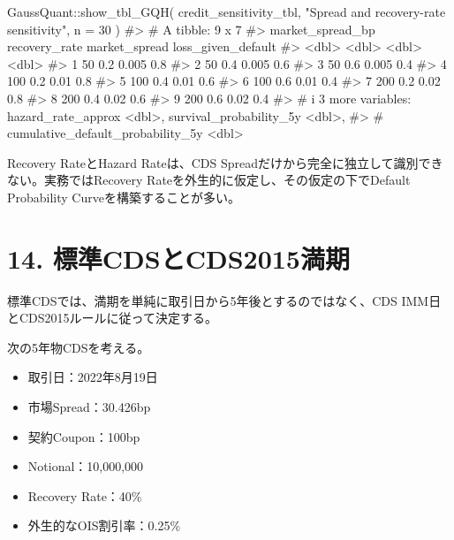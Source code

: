 \documentclass[
  letterpaper,
  DIV=11,
  numbers=noendperiod]{scrreprt}
\newenvironment{Shaded}{\begin{snugshade}}{\end{snugshade}}
\newcommand{\AttributeTok}[1]{\textcolor[rgb]{0.40,0.45,0.13}{#1}}
\newcommand{\CommentTok}[1]{\textcolor[rgb]{0.37,0.37,0.37}{#1}}
\newcommand{\DecValTok}[1]{\textcolor[rgb]{0.68,0.00,0.00}{#1}}
\newcommand{\FunctionTok}[1]{\textcolor[rgb]{0.28,0.35,0.67}{#1}}
\newcommand{\NormalTok}[1]{\textcolor[rgb]{0.00,0.23,0.31}{#1}}
\newcommand{\SpecialCharTok}[1]{\textcolor[rgb]{0.37,0.37,0.37}{#1}}
\newcommand{\StringTok}[1]{\textcolor[rgb]{0.13,0.47,0.30}{#1}}
\providecommand{\tightlist}{%
  \setlength{\itemsep}{0pt}\setlength{\parskip}{0pt}}
\begin{document}
\begin{Shaded}
\begin{Highlighting}[]
\NormalTok{GaussQuant}\SpecialCharTok{::}\FunctionTok{show\_tbl\_GQH}\NormalTok{(}
\NormalTok{  credit\_sensitivity\_tbl,}
  \StringTok{"Spread and recovery{-}rate sensitivity"}\NormalTok{,}
  \AttributeTok{n =} \DecValTok{30}
\NormalTok{)}
\CommentTok{\#\textgreater{} \# A tibble: 9 x 7}
\CommentTok{\#\textgreater{}   market\_spread\_bp recovery\_rate market\_spread loss\_given\_default}
\CommentTok{\#\textgreater{}              \textless{}dbl\textgreater{}         \textless{}dbl\textgreater{}         \textless{}dbl\textgreater{}              \textless{}dbl\textgreater{}}
\CommentTok{\#\textgreater{} 1               50           0.2         0.005                0.8}
\CommentTok{\#\textgreater{} 2               50           0.4         0.005                0.6}
\CommentTok{\#\textgreater{} 3               50           0.6         0.005                0.4}
\CommentTok{\#\textgreater{} 4              100           0.2         0.01                 0.8}
\CommentTok{\#\textgreater{} 5              100           0.4         0.01                 0.6}
\CommentTok{\#\textgreater{} 6              100           0.6         0.01                 0.4}
\CommentTok{\#\textgreater{} 7              200           0.2         0.02                 0.8}
\CommentTok{\#\textgreater{} 8              200           0.4         0.02                 0.6}
\CommentTok{\#\textgreater{} 9              200           0.6         0.02                 0.4}
\CommentTok{\#\textgreater{} \# i 3 more variables: hazard\_rate\_approx \textless{}dbl\textgreater{}, survival\_probability\_5y \textless{}dbl\textgreater{},}
\CommentTok{\#\textgreater{} \#   cumulative\_default\_probability\_5y \textless{}dbl\textgreater{}}
\end{Highlighting}
\end{Shaded}

Recovery RateとHazard Rateは、CDS
Spreadだけから完全に独立して識別できない。実務ではRecovery
Rateを外生的に仮定し、その仮定の下でDefault Probability
Curveを構築することが多い。

\section{14.
標準CDSとCDS2015満期}\label{ux6a19ux6e96cdsux3068cds2015ux6e80ux671f}

標準CDSでは、満期を単純に取引日から5年後とするのではなく、CDS
IMM日とCDS2015ルールに従って決定する。

次の5年物CDSを考える。

\begin{itemize}
\tightlist
\item
  取引日：2022年8月19日
\item
  市場Spread：30.426bp
\item
  契約Coupon：100bp
\item
  Notional：10,000,000
\item
  Recovery Rate：40\%
\item
  外生的なOIS割引率：0.25\%
\end{itemize}
\end{document}

